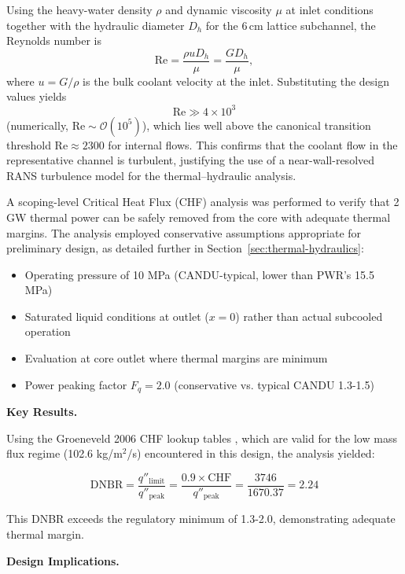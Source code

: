 \documentclass[12pt]{article}
\numberwithin{equation}{section}
\begin{document}
Using the heavy-water density $\rho$ and dynamic viscosity $\mu$ at inlet conditions together with the hydraulic diameter $D_h$ for the 6\,cm lattice subchannel, the Reynolds number is
\[
\mathrm{Re} = \frac{\rho u D_h}{\mu}
= \frac{G D_h}{\mu},
\]
where $u = G/\rho$ is the bulk coolant velocity at the inlet. Substituting the design values yields
\[
\mathrm{Re} \gg 4\times10^{3}
\]
(numerically, $\mathrm{Re} \sim \mathcal{O}(10^{5})$), which lies well above the canonical transition threshold $\mathrm{Re} \approx 2300$ for internal flows. This confirms that the coolant flow in the representative channel is turbulent, justifying the use of a near-wall-resolved RANS turbulence model for the thermal--hydraulic analysis.

A scoping-level Critical Heat Flux (CHF) analysis was performed to verify that 2 GW thermal power can be safely removed from the core with adequate thermal margins. The analysis employed conservative assumptions appropriate for preliminary design, as detailed further in Section~\ref{sec:thermal-hydraulics}:

\begin{itemize}
    \item Operating pressure of 10 MPa (CANDU-typical, lower than PWR's 15.5 MPa)
    \item Saturated liquid conditions at outlet ($x = 0$) rather than actual subcooled operation
    \item Evaluation at core outlet where thermal margins are minimum
    \item Power peaking factor $F_q = 2.0$ (conservative vs. typical CANDU 1.3-1.5)
\end{itemize}

\textbf{Key Results.}

Using the Groeneveld 2006 CHF lookup tables \cite{Groeneveld2007TheTable}, which are valid for the low mass flux regime (102.6 kg/m$^2$/s) encountered in this design, the analysis yielded:

\begin{equation}
\text{DNBR} = \frac{q''_{\text{limit}}}{q''_{\text{peak}}} = \frac{0.9 \times \text{CHF}}{q''_{\text{peak}}} = \frac{3746}{1670.37} = 2.24
\end{equation}

This DNBR exceeds the regulatory minimum of 1.3-2.0, demonstrating adequate thermal margin.


\newpage

\textbf{Design Implications.}
\end{document}
